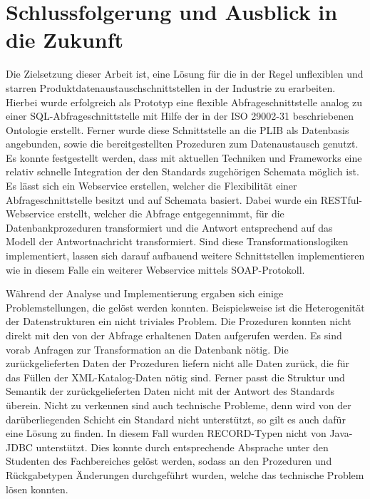 \chapter*{Schlussfolgerung und Ausblick in die Zukunft}


Die Zielsetzung dieser Arbeit ist, eine Lösung für die in der Regel unflexiblen und starren Produktdatenaustauschschnittstellen in der Industrie zu erarbeiten. Hierbei wurde erfolgreich als Prototyp eine flexible \gls{Abfrageschnittstelle} analog zu einer SQL-\gls{Abfrageschnittstelle} mit Hilfe der in der ISO 29002-31 beschriebenen \gls{Ontologie} erstellt. Ferner wurde diese Schnittstelle an die \gls{PLIB} als Datenbasis angebunden, sowie die bereitgestellten Prozeduren zum Datenaustausch genutzt. Es konnte festgestellt werden, dass mit aktuellen Techniken und Frameworks eine relativ schnelle Integration der den Standards zugehörigen Schemata möglich ist. Es lässt sich ein \gls{Webservice} erstellen, welcher die Flexibilität einer \gls{Abfrageschnittstelle} besitzt und auf Schemata basiert. Dabei wurde ein \gls{REST}ful-\gls{Webservice} erstellt, welcher die Abfrage entgegennimmt, für die Datenbankprozeduren transformiert und die Antwort entsprechend auf das Modell der Antwortnachricht transformiert. Sind diese Transformationslogiken implementiert, lassen sich darauf aufbauend weitere Schnittstellen implementieren wie in diesem Falle ein weiterer \gls{Webservice} mittels \gls{SOAP}-Protokoll. 

Während der Analyse und Implementierung ergaben sich einige Problemstellungen, die gelöst werden konnten. Beispielsweise ist die Heterogenität der Datenstrukturen ein nicht triviales Problem. Die Prozeduren konnten nicht direkt mit den von der Abfrage erhaltenen Daten aufgerufen werden. Es sind vorab Anfragen zur Transformation an die Datenbank nötig. 
Die zurückgelieferten Daten der Prozeduren liefern nicht alle Daten zurück, die für das Füllen der XML-Katalog-Daten nötig sind. Ferner passt die Struktur und Semantik der zurückgelieferten Daten nicht mit der Antwort des Standards überein. Nicht zu verkennen sind auch technische Probleme, denn wird von der darüberliegenden Schicht ein Standard nicht unterstützt, so gilt es auch dafür eine Lösung zu finden. In diesem Fall wurden RECORD-Typen nicht von Java-JDBC unterstützt.
Dies konnte durch entsprechende Absprache unter den Studenten des Fachbereiches gelöst werden, sodass an den Prozeduren und Rückgabetypen Änderungen durchgeführt wurden, welche das technische Problem lösen konnten.

